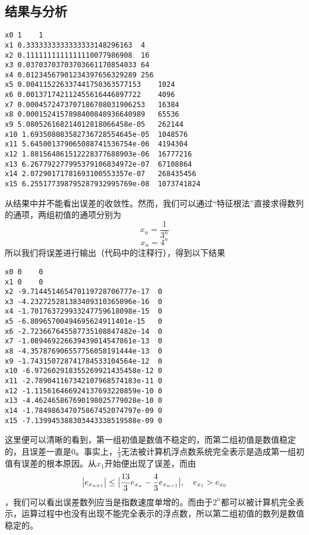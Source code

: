 \documentclass[a4paper,11pt,onecolumn,twoside]{article}
\begin{document}
\subsection{结果与分析}
\begin{lstlisting}
x0 1	1
x1 0.3333333333333333148296163	4
x2 0.1111111111111110077986908	16
x3 0.03703703703703661170854033	64
x4 0.01234567901234397656329289	256
x5 0.004115226337441750363577153	1024
x6 0.001371742112455616446897722	4096
x7 0.0004572473707186708031906253	16384
x8 0.0001524157898400848936640989	65536
x9 5.080526168214012818066458e-05	262144
x10 1.693508083582736728554645e-05	1048576
x11 5.645001379065088741536754e-06	4194304
x12 1.881564861512228377688903e-06	16777216
x13 6.267792277995379106834972e-07	67108864
x14 2.07290171781693100553357e-07	268435456
x15 6.255177398795287932995769e-08	1073741824
\end{lstlisting}
从结果中并不能看出误差的收敛性。然而，我们可以通过“特征根法”直接求得数列的通项，两组初值的通项分别为$$x_{n}=\frac{1}{3^{n}}$$$$x_{n}=4^{n}$$所以我们将误差进行输出（代码中的注释行），得到以下结果
\begin{lstlisting}
x0 0	0
x1 0	0
x2 -9.714451465470119728706777e-17	0
x3 -4.232725281383409310365096e-16	0
x4 -1.701763729933247759618098e-15	0
x5 -6.80965700494695624911401e-15	0
x6 -2.723667645587735108847482e-14	0
x7 -1.089469226639439014547861e-13	0
x8 -4.357876906557756058191444e-13	0
x9 -1.743150728741784533104564e-12	0
x10 -6.972602918355269921435458e-12	0
x11 -2.789041167342107968574183e-11	0
x12 -1.115616466924137693220859e-10	0
x13 -4.462465867690198025779028e-10	0
x14 -1.784986347075867452074797e-09	0
x15 -7.139945388303443338519588e-09	0
\end{lstlisting}
这里便可以清晰的看到，第一组初值是数值不稳定的，而第二组初值是数值稳定的，且误差一直是0。事实上，$\frac{1}{3}$无法被计算机浮点数系统完全表示是造成第一组初值有误差的根本原因。从$x_{1}$开始便出现了误差，而由$$ \big{|}e_{x _ { n + 1 }} \big{|}\leq \big{|}\frac { 13 } { 3 } e_{x _ { n }} - \frac { 4 } { 3 } e_{x _ { n - 1 }}\big{|}, \quad e_{x_{1}}>e_{x_{0}}$$，我们可以看出误差数列应当是指数速度单增的。而由于$2^{n}$都可以被计算机完全表示，运算过程中也没有出现不能完全表示的浮点数，所以第二组初值的数列是数值稳定的。
\end{document}
